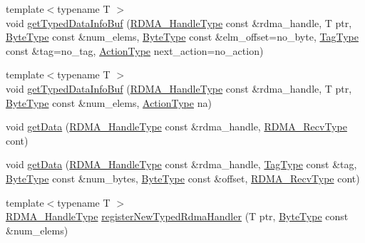 \begin{DoxyCompactItemize}
{\footnotesize template$<$typename T $>$ }\\void \hyperlink{structvt_1_1rdma_1_1_r_d_m_a_manager_a267d1a2da52abf259119da964b9051f0}{get\+Typed\+Data\+Info\+Buf} (\hyperlink{namespacevt_a10442579ec4e7ebef223818e64bcf908}{R\+D\+M\+A\+\_\+\+Handle\+Type} const \&rdma\+\_\+handle, T ptr, \hyperlink{namespacevt_aab8d55968084610ce3b17057981e9300}{Byte\+Type} const \&num\+\_\+elems, \hyperlink{namespacevt_aab8d55968084610ce3b17057981e9300}{Byte\+Type} const \&elm\+\_\+offset=no\+\_\+byte, \hyperlink{namespacevt_a84ab281dae04a52a4b243d6bf62d0e52}{Tag\+Type} const \&tag=no\+\_\+tag, \hyperlink{namespacevt_ae0a5a7b18cc99d7b732cb4d44f46b0f3}{Action\+Type} next\+\_\+action=no\+\_\+action)
\item 
{\footnotesize template$<$typename T $>$ }\\void \hyperlink{structvt_1_1rdma_1_1_r_d_m_a_manager_a59f4ee000f6c382289fa6c186962d1d1}{get\+Typed\+Data\+Info\+Buf} (\hyperlink{namespacevt_a10442579ec4e7ebef223818e64bcf908}{R\+D\+M\+A\+\_\+\+Handle\+Type} const \&rdma\+\_\+handle, T ptr, \hyperlink{namespacevt_aab8d55968084610ce3b17057981e9300}{Byte\+Type} const \&num\+\_\+elems, \hyperlink{namespacevt_ae0a5a7b18cc99d7b732cb4d44f46b0f3}{Action\+Type} na)
\item 
void \hyperlink{structvt_1_1rdma_1_1_r_d_m_a_manager_aebefa1395f990efb66284adc1495f6d4}{get\+Data} (\hyperlink{namespacevt_a10442579ec4e7ebef223818e64bcf908}{R\+D\+M\+A\+\_\+\+Handle\+Type} const \&rdma\+\_\+handle, \hyperlink{namespacevt_1_1rdma_aa07fa86d8eca8853254b40fc0e565726}{R\+D\+M\+A\+\_\+\+Recv\+Type} cont)
\item 
void \hyperlink{structvt_1_1rdma_1_1_r_d_m_a_manager_a214cf0d741a5dd197e12a3fcd6ea2c47}{get\+Data} (\hyperlink{namespacevt_a10442579ec4e7ebef223818e64bcf908}{R\+D\+M\+A\+\_\+\+Handle\+Type} const \&rdma\+\_\+handle, \hyperlink{namespacevt_a84ab281dae04a52a4b243d6bf62d0e52}{Tag\+Type} const \&tag, \hyperlink{namespacevt_aab8d55968084610ce3b17057981e9300}{Byte\+Type} const \&num\+\_\+bytes, \hyperlink{namespacevt_aab8d55968084610ce3b17057981e9300}{Byte\+Type} const \&offset, \hyperlink{namespacevt_1_1rdma_aa07fa86d8eca8853254b40fc0e565726}{R\+D\+M\+A\+\_\+\+Recv\+Type} cont)
\item 
{\footnotesize template$<$typename T $>$ }\\\hyperlink{namespacevt_a10442579ec4e7ebef223818e64bcf908}{R\+D\+M\+A\+\_\+\+Handle\+Type} \hyperlink{structvt_1_1rdma_1_1_r_d_m_a_manager_a69d6fc1f017047de79f3c1190e55ac53}{register\+New\+Typed\+Rdma\+Handler} (T ptr, \hyperlink{namespacevt_aab8d55968084610ce3b17057981e9300}{Byte\+Type} const \&num\+\_\+elems)

\end{DoxyCompactItemize}
